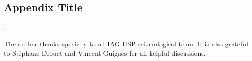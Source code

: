 \documentclass[draft, grl]{agutex}
\begin{document}
\begin{article}


\appendix

\section{Appendix Title}

.


%
%
%

\begin{acknowledgments}
The author thanks specially to 
all IAG-USP seismological team. It is also grateful to Stéphane Drouet and Vincent Guigues for all helpful discussions.
\end{acknowledgments}



\end{article}
\end{document}
